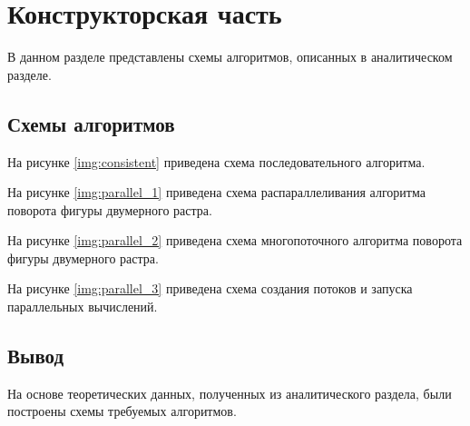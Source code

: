 \chapter{Конструкторская часть}

В данном разделе представлены схемы алгоритмов, описанных в аналитическом разделе.

\section{Схемы алгоритмов}

На рисунке \ref{img:consistent} приведена схема последовательного алгоритма.


\clearpage

На рисунке \ref{img:parallel_1} приведена схема распараллеливания алгоритма поворота фигуры двумерного растра.


\clearpage

На рисунке \ref{img:parallel_2} приведена схема многопоточного алгоритма поворота фигуры двумерного растра.


\clearpage

На рисунке \ref{img:parallel_3} приведена схема создания потоков и запуска параллельных вычислений.




\section{Вывод}

На основе теоретических данных, полученных из аналитического раздела, были построены схемы требуемых алгоритмов.


